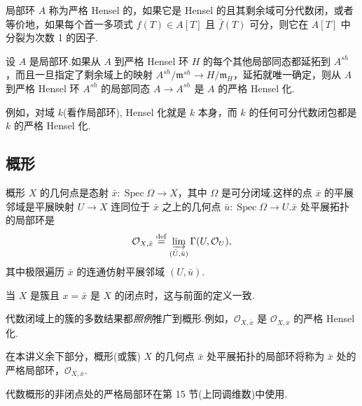 局部环 $A$ 称为严格 Hensel 的，如果它是 Hensel 的且其剩余域可分代数闭，或者等价地，如果每个首一多项式 $f(T) \in A[T]$ 且 $\bar{f}(T)$ 可分，则它在 $A[T]$ 中分裂为次数 1 的因子.

\begin{definition}\label{def:4.18}
设 $A$ 是局部环.如果从 $A$ 到严格 Hensel 环 $H$ 的每个其他局部同态都延拓到 $A^{sh}$，而且一旦指定了剩余域上的映射 $A^{sh}/\mathfrak{m}^{sh} \to H/\mathfrak{m}_{H}$，延拓就唯一确定，则从 $A$ 到严格 Hensel 环 $A^{sh}$ 的局部同态 $A \to A^{sh}$ 是 $A$ 的严格 Hensel 化.
\end{definition}

例如，对域 $k$(看作局部环), Hensel 化就是 $k$ 本身，而 $k$ 的任何可分代数闭包都是 $k$ 的严格 Hensel 化.

\subsection*{概形}

概形 $X$ 的几何点是态射 $\bar{x} \colon \operatorname{Spec} \Omega \to X$，其中 $\Omega$ 是可分闭域.这样的点 $\bar{x}$ 的平展邻域是平展映射 $U \to X$ 连同位于 $\bar{x}$ 之上的几何点 $\bar{u} \colon \operatorname{Spec} \Omega \to U$.$\bar{x}$ 处平展拓扑的局部环是
\[
\mathcal{O}_{X, \bar{x}} \overset{\mathrm{def}}{=} \varinjlim_{(\bar{U}, \bar{u})} \Gamma(U, \mathcal{O}_U),
\]
其中极限遍历 $\bar{x}$ 的连通仿射平展邻域 $(U, \bar{u})$.

当 $X$ 是簇且 $x = \bar{x}$ 是 $X$ 的闭点时，这与前面的定义一致.

代数闭域上的簇的多数结果都\emph{照例}推广到概形.例如，$\mathcal{O}_{X, \bar{x}}$ 是 $\mathcal{O}_{X, x}$ 的严格 Hensel 化.

在本讲义余下部分，概形(或簇) $X$ 的几何点 $\bar{x}$ 处平展拓扑的局部环将称为 $\bar{x}$ 处的严格局部环，$\mathcal{O}_{X, \bar{x}}$.

代数概形的非闭点处的严格局部环在第 15 节(上同调维数)中使用.
